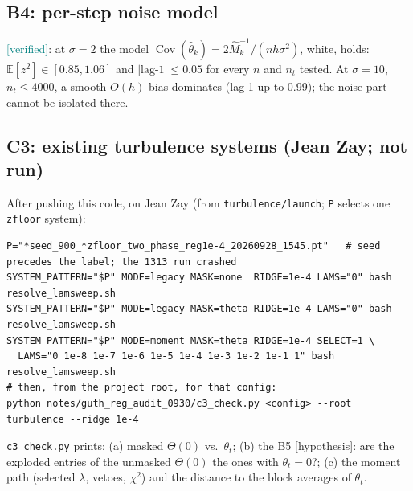 \documentclass[11pt,a4paper]{article}
\newcommand{\code}[1]{\texttt{#1}}
\newcommand{\ver}{\textcolor{teal}{\textsf{[verified]}}}
\newcommand{\hyp}{\textcolor{orange!80!black}{\textsf{[hypothesis]}}}
\newcommand{\E}{\mathbb{E}}
\newcommand{\Cov}{\operatorname{Cov}}
\newcommand{\MGD}{\textsc{mgd}}
\begin{document}
\subsection{B4: per-step noise model}
\ver: at $\sigma=2$ the model $\Cov(\hat\theta_k)=2\hat M_k^{-1}/(nh\sigma^2)$, white, holds: $\E[z^2]\in[0.85,1.06]$ and $|\text{lag-1}|\le0.05$ for every $n$ and $n_t$ tested.
At $\sigma=10$, $n_t\le4000$, a smooth $O(h)$ bias dominates (lag-1 up to 0.99); the noise part cannot be isolated there.
\begin{table}[h]\centering\small

\caption{$z_k=\sqrt{nh\sigma^2/2}\,L_k^\top(\hat\theta_k-\theta_t)$, $L_kL_k^\top=\hat M_k+\varepsilon D_k$, $0.05\le t\le0.95$ (\MGD\ sign; reference $\theta_t$ from
Fokker--Planck in C1, exact in C2). The model predicts $\E[z^2]=1$ and lag-1 autocorrelation 0. A deterministic $O(h)$ bias of $\hat\theta_k$ adds to
$\E[z^2]$ in proportion to $nh$.}\label{tab:B4}
\end{table}

\subsection{C3: existing turbulence systems (Jean Zay; not run)}\label{sec:c3}
After pushing this code, on Jean Zay (from \code{turbulence/launch}; \code{P} selects one \code{zfloor} system):
{\small\begin{verbatim}
P="*seed_900_*zfloor_two_phase_reg1e-4_20260928_1545.pt"   # seed precedes the label; the 1313 run crashed
SYSTEM_PATTERN="$P" MODE=legacy MASK=none  RIDGE=1e-4 LAMS="0" bash resolve_lamsweep.sh
SYSTEM_PATTERN="$P" MODE=legacy MASK=theta RIDGE=1e-4 LAMS="0" bash resolve_lamsweep.sh
SYSTEM_PATTERN="$P" MODE=moment MASK=theta RIDGE=1e-4 SELECT=1 \
  LAMS="0 1e-8 1e-7 1e-6 1e-5 1e-4 1e-3 1e-2 1e-1 1" bash resolve_lamsweep.sh
# then, from the project root, for that config:
python notes/guth_reg_audit_0930/c3_check.py <config> --root turbulence --ridge 1e-4
\end{verbatim}}
\noindent\code{c3\_check.py} prints: (a) masked $\Theta(0)$ vs.\ $\theta_t$; (b) the B5 \hyp: are the exploded entries of the unmasked $\Theta(0)$ the ones with $\theta_t=0$?;
(c) the moment path (selected $\lambda$, vetoes, $\chi^2$) and the distance to the block averages of $\theta_t$.

\end{document}
